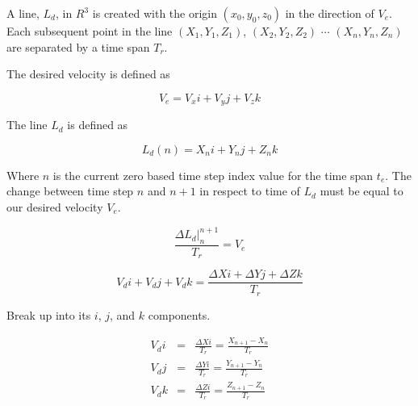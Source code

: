 A line, $L_d$, in $R^3$ is created with the origin $(x_0, y_0, z_0)$ in the direction of $V_e$.  Each subsequent point in the line $(X_1, Y_1, Z_1)$, $(X_2, Y_2, Z_2)$ $\cdots$ $(X_n, Y_n, Z_n)$ are separated by a time span $T_r$.

The desired velocity is defined as

\begin{equation}
V_e = V_xi+V_yj+V_zk
\end{equation}




The line $L_d$ is defined as

\begin{equation}
L_d(n) = X_ni + Y_nj + Z_nk
\end{equation}

Where $n$ is the current zero based time step index value for the time span $t_e$.  The change between time step $n$ and $n+1$ in respect to time of $L_d$  must be equal to our desired velocity $V_e$.


\begin{equation}
\frac{\Delta L_d|_n^{n+1}}{T_r} = V_e
\end{equation}

\begin{equation}
V_di+V_dj+V_dk = \frac{\Delta Xi + \Delta Yj + \Delta Zk}{T_r}
\end{equation}

Break up into its $i$, $j$, and $k$ components.

\begin{eqnarray} 
V_di & = &  \frac{\Delta Xi}{T_r}  =  \frac{X_{n+1} - X_n}{T_r}\\
V_dj & = &  \frac{\Delta Yi}{T_r}  =  \frac{Y_{n+1} - Y_n}{T_r}\\
V_dk & = &  \frac{\Delta Zi}{T_r}  =  \frac{Z_{n+1} - Z_n}{T_r}
\end{eqnarray}


